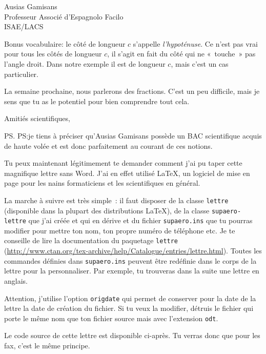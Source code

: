 \documentclass[pdftex,a4paper,12pt,origdate]{supaero-lettre}
\begin{document}
\begin{letter}{Ausias Gamisans\\ Professeur Associé d'Espagnolo
    Facilo\\ISAE/LACS}

Bonus vocabulaire: le côté de longueur $c$ s'appelle
\emph{l'hypoténuse}. Ce n'est pas vrai pour tous les côtés de longueur
$c$, il s'agit en fait du côté qui ne «~touche~» pas l'angle
droit. Dans notre exemple il est de longueur $c$, mais c'est un cas
particulier.

La semaine prochaine, nous parlerons des fractions. C'est un peu
difficile, mais je sens que tu as le potentiel pour bien comprendre
tout cela.

\closing{Amitiés scientifiques,}

\ps{PS:}{je tiens à préciser qu'Ausias Gamisans possède un BAC scientifique
acquis de haute volée et est donc parfaitement au courant de ces
notions.}

\vspace{2cm}

Tu peux maintenant légitimement te demander comment j'ai pu taper
cette magnifique lettre sans Word. J'ai en effet utilisé \LaTeX, un
logiciel de mise en page pour les nains formaticiens et les
scientifiques en général.

La marche à suivre est très simple~: il faut disposer de la classe
\texttt{lettre} (disponible dans la plupart des distributions \LaTeX),
de la classe \texttt{supaero-lettre} que j'ai créée et qui en dérive
et du fichier \texttt{supaero.ins} que tu pourras modifier pour mettre
ton nom, ton propre numéro de téléphone etc. Je te conseille de lire
la documentation du paquetage \texttt{lettre}
(\url{http://www.ctan.org/tex-archive/help/Catalogue/entries/lettre.html}). Toutes
les commandes définies dans \texttt{supaero.ins} peuvent être
redéfinie dans le corps de la lettre pour la personnaliser. Par
exemple, tu trouveras dans la suite une lettre en anglais.

Attention, j'utilise l'option \texttt{origdate} qui permet de
conserver pour la date de la lettre la date de création du fichier. Si
tu veux la modifier, détruis le fichier qui porte le même nom que ton
fichier source mais avec l'extension \texttt{odt}.

Le code source de cette lettre est disponible ci-après. Tu verras donc
que pour les fax, c'est le même principe.



\end{letter}
\end{document}
